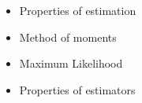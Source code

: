 \begin{itemize}
	\item Properties of estimation
	\item Method of moments
	\item Maximum Likelihood
	\item Properties of estimators
\end{itemize}
